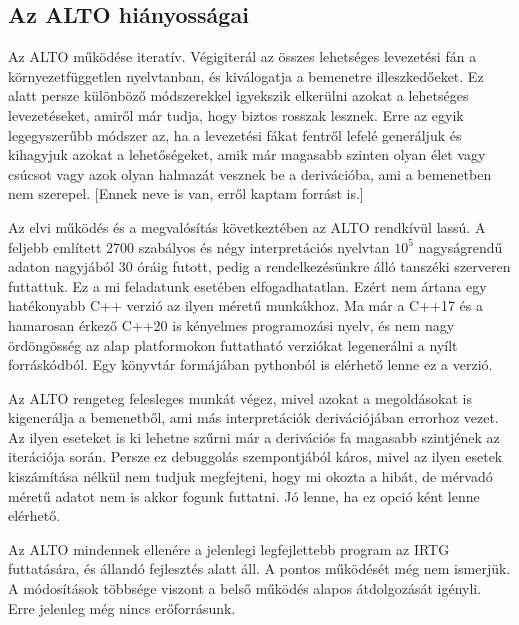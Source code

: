 \subsection{Az ALTO hiányosságai}

Az ALTO működése iteratív. Végigiterál az összes lehetséges levezetési fán a környezetfüggetlen nyelvtanban, és kiválogatja a bemenetre illeszkedőeket. Ez alatt persze különböző módszerekkel igyekszik elkerülni azokat a lehetséges levezetéseket, amiről már tudja, hogy biztos rosszak lesznek. Erre az egyik legegyszerűbb módszer az, ha a levezetési fákat fentről lefelé generáljuk és kihagyjuk azokat a lehetőségeket, amik már magasabb szinten olyan élet vagy csúcsot vagy azok olyan halmazát vesznek be a derivációba, ami a bemenetben nem szerepel. [Ennek neve is van, erről kaptam forrást is.]

Az elvi működés és a megvalósítás következtében az ALTO rendkívül lassú. A feljebb említett 2700 szabályos és négy interpretációs nyelvtan $10^5$ nagyságrendű adaton nagyjából 30 óráig futott, pedig a rendelkezésünkre álló tanszéki szerveren futtattuk. Ez a mi feladatunk esetében elfogadhatatlan. Ezért nem ártana egy hatékonyabb C++ verzió az ilyen méretű munkákhoz. Ma már a C++17 és a hamarosan érkező C++20 is kényelmes programozási nyelv, és nem nagy ördöngösség az alap platformokon futtatható verziókat legenerálni a nyílt forráskódból. Egy könyvtár formájában pythonból is elérhető lenne ez a verzió.

Az ALTO rengeteg felesleges munkát végez, mivel azokat a megoldásokat is kigenerálja a bemenetből, ami más interpretációk derivációjában errorhoz vezet. Az ilyen eseteket is ki lehetne szűrni már a derivációs fa magasabb szintjének az iterációja során. Persze ez debuggolás szempontjából káros, mivel az ilyen esetek kiszámítása nélkül nem tudjuk megfejteni, hogy mi okozta a hibát, de mérvadó méretű adatot nem is akkor fogunk futtatni. Jó lenne, ha ez opció ként lenne elérhető.

Az ALTO mindennek ellenére a jelenlegi legfejlettebb program az IRTG futtatására, és állandó fejlesztés alatt áll. A pontos működését még nem ismerjük. A módosítások többsége viszont a belső működés alapos átdolgozását igényli. Erre jelenleg még nincs erőforrásunk.

